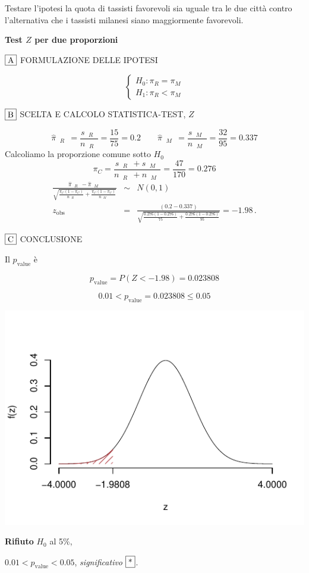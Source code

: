 \documentclass[
  11pt,
]{book}
\theoremstyle{mytheoremstyle}
\theoremstyle{mydefstyle}
\newenvironment{sol}
  {
  \begin{tcolorbox}[enhanced,breakable,arc=0.1mm,boxrule=1pt,colback=white,colframe=iblue,
  title=\bf \fontfamily{lmss}\selectfont \hspace{.5 cm} Soluzione,drop fuzzy shadow]

}{
\end{tcolorbox}
  }
\begin{document}
Testare l'ipotesi la quota di tassisti favorevoli sia uguale tra le due città contro
l'alternativa che i tassisti milanesi siano maggiormente favorevoli.

\begin{sol}
\textbf{Test \(Z\) per due proporzioni}

\(\fbox{A}\) FORMULAZIONE DELLE IPOTESI

\[\begin{cases}
   H_0: \pi_\text{$R$} = \pi_\text{$M$} \\
   H_1: \pi_\text{$R$} < \pi_\text{$M$} 
   \end{cases}\]

\(\fbox{B}\) SCELTA E CALCOLO STATISTICA-TEST, \(Z\)

\[\hat\pi_\text{ $R$ }=\frac{s_\text{ $R$ }}{n_\text{ $R$ }}=\frac{ 15 }{ 75 }= 0.2 \qquad
   \hat\pi_\text{ $M$ }=\frac{s_\text{ $M$ }}{n_\text{ $M$ }}=\frac{ 32 }{ 95 }= 0.337 \]Calcoliamo la proporzione comune sotto \(H_0\)
\[
     \pi_C=\frac{s_\text{ $R$ }+s_\text{ $M$ }}{n_\text{ $R$ }+n_\text{ $M$ }}=
     \frac{ 47 }{ 170 }= 0.276 
   \]\begin{eqnarray*}
   \frac{\hat\pi_\text{ $R$ } - \hat\pi_\text{ $M$ }}
   {\sqrt{\frac {\pi_C(1-\pi_C)}{n_\text{ $R$ }}+\frac {\pi_C(1-\pi_C)}{n_\text{ $M$ }}}}&\sim&N(0,1)\\
   z_{\text{obs}}
   &=& \frac{ ( 0.2 -  0.337 )} {\sqrt{\frac{ 0.276 (1- 0.276 )}{ 75 }+\frac{ 0.276 (1- 0.276 )}{ 95 }}}
   =   -1.98 \, .
   \end{eqnarray*}

\(\fbox{C}\) CONCLUSIONE

Il \(p_{\text{value}}\) è

\[ p_{\text{value}} = P(Z<-1.98)=0.023808 \]

\[
 0.01 < p_\text{value}= 0.023808 \leq 0.05 
\]

\begin{center}\includegraphics{Esami_passati_con_soluzioni_files/figure-latex/2022-108-1} \end{center}

\textbf{Rifiuto} \(H_0\) al 5\%,

\(0.01<p_\text{value}<0.05\), \emph{significativo} \(\fbox{*}\).

\end{sol}
\end{document}
